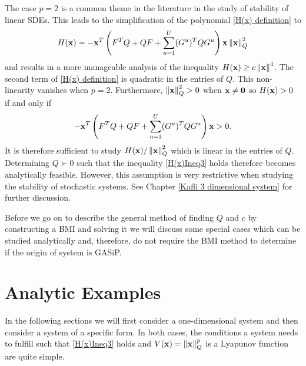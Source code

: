 \documentclass[a4paper,12pt,twoside,BCOR=10mm]{scrbook}
\begin{document}
The case $p = 2$ is a common theme in the literature in the study of stability of linear SDEs. This leads to the simplification of the polynomial \eqref{H(x) definition} to
\begin{align*}
    H(\mathbf{x}) = -\mathbf{x}^T \left(F^T Q + QF + \sum_{u = 1}^U (G^u)^TQG^u\right) \mathbf{x}\left\lVert\mathbf{x}\right\rVert_{Q}^{2}
\end{align*}
and results in a more manageable analysis of the inequality $H(\mathbf{x}) \geq c\left\lVert\mathbf{x}\right\rVert_{}^{4}$. The second term of \eqref{H(x) definition} is quadratic in the entries of $Q$. This non-linearity vanishes when $p = 2$. Furthermore, $\left\lVert\mathbf{x}\right\rVert_{Q}^{2} > 0$ when $\mathbf{x} \neq \mathbf{0}$ so $H(\mathbf{x}) > 0$ if and only if
\begin{align*}
    -\mathbf{x}^T \left(F^T Q + QF + \sum_{u = 1}^U (G^u)^TQG^u\right) \mathbf{x} > 0.
\end{align*}
It is therefore sufficient to study $H(\mathbf{x}) / \left\lVert\mathbf{x}\right\rVert_{Q}^{2}$ which is linear in the entries of $Q$. Determining $Q \succ 0$ such that the inequality \eqref{H(x)Ineq3} holds therefore becomes analytically feasible. However, this assumption is very restrictive when studying the stability of stochastic systems. See Chapter \ref{Kafli 3 dimensional system} for further discussion.

Before we go on to describe the general method of finding $Q$ and $c$ by constructing a BMI and solving it we will discuss some special cases which can be studied analytically and, therefore, do not require the BMI method to determine if the origin of system is GASiP.

\section{Analytic Examples}\label{SectionAnalyticExamples}
In the following sections we will first consider a one-dimensional system and then consider a system of a specific form. In both cases, the conditions a system needs to fulfill such that \eqref{H(x)Ineq3} holds and $V(\mathbf{x}) = \left\lVert\mathbf{x}\right\rVert_Q^p$ is a Lyapunov function are quite simple.
\end{document}
